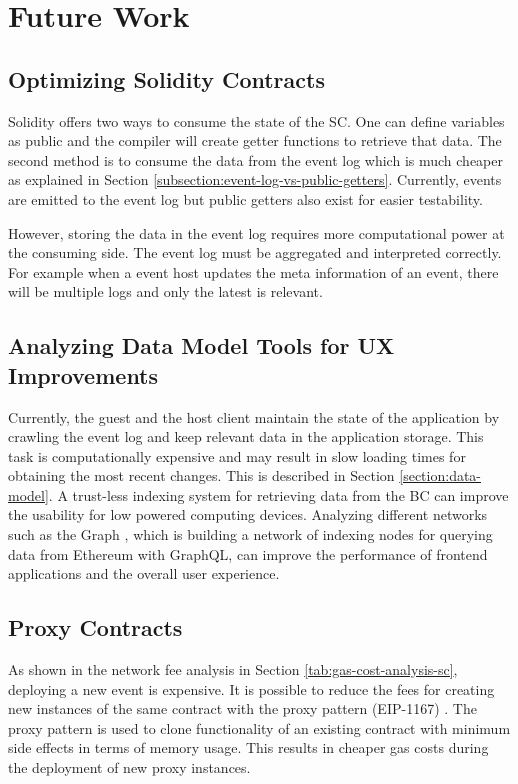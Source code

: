 \chapter{Future Work}

\section{Optimizing Solidity Contracts}
Solidity offers two ways to consume the state of the SC. One can define variables as public and the compiler will create getter functions to retrieve that data. The second method is to consume the data from the event log which is much cheaper as explained in Section \ref{subsection:event-log-vs-public-getters}. Currently, events are emitted to the event log but public getters also exist for easier testability.

However, storing the data in the event log requires more computational power at the consuming side. The event log must be aggregated and interpreted correctly. For example when a event host updates the meta information of an event, there will be multiple logs and only the latest is relevant. 

\section{Analyzing Data Model Tools for UX Improvements}
Currently, the guest and the host client maintain the state of the application by crawling the event log and keep relevant data in the application storage. This task is computationally expensive and may result in slow loading times for obtaining the most recent changes. This is described in Section \ref{section:data-model}. A trust-less indexing system for retrieving data from the BC can improve the usability for low powered computing devices. Analyzing different networks such as the Graph \cite{the-graph}, which is building a network of indexing nodes for querying data from Ethereum with GraphQL, can improve the performance of frontend applications and the overall user experience.

\section{Proxy Contracts}
As shown in the network fee analysis in Section \ref{tab:gas-cost-analysis-sc}, deploying a new event is expensive. It is possible to reduce the fees for creating new instances of the same contract with the proxy pattern (EIP-1167) \cite{solidity-proxy-pattern}. The proxy pattern is used to clone functionality of an existing contract with minimum side effects in terms of memory usage. This results in cheaper gas costs during the deployment of new proxy instances. 

